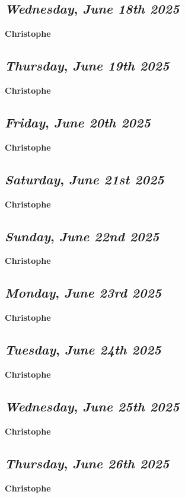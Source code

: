\def\day{\textit{June 18th 2025}}
\def\weekday{\textit{Wednesday}}
\subsection*{\weekday, \day}
\textbf {Christophe}

\def\day{\textit{June 19th 2025}}
\def\weekday{\textit{Thursday}}
\subsection*{\weekday, \day}
\textbf {Christophe}

\def\day{\textit{June 20th 2025}}
\def\weekday{\textit{Friday}}
\subsection*{\weekday, \day}
\textbf {Christophe}

\def\day{\textit{June 21st 2025}}
\def\weekday{\textit{Saturday}}
\subsection*{\weekday, \day}
\textbf {Christophe}

\def\day{\textit{June 22nd 2025}}
\def\weekday{\textit{Sunday}}
\subsection*{\weekday, \day}
\textbf {Christophe}

\def\day{\textit{June 23rd 2025}}
\def\weekday{\textit{Monday}}
\subsection*{\weekday, \day}
\textbf {Christophe}

\def\day{\textit{June 24th 2025}}
\def\weekday{\textit{Tuesday}}
\subsection*{\weekday, \day}
\textbf {Christophe}

\def\day{\textit{June 25th 2025}}
\def\weekday{\textit{Wednesday}}
\subsection*{\weekday, \day}
\textbf {Christophe}

\def\day{\textit{June 26th 2025}}
\def\weekday{\textit{Thursday}}
\subsection*{\weekday, \day}
\textbf {Christophe}

